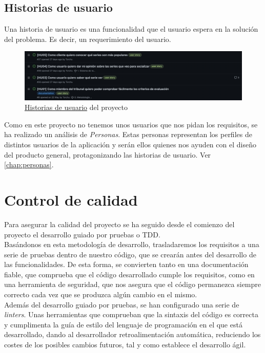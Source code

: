 \subsection{Historias de usuario}
Una historia de usuario es una funcionalidad que el usuario espera en la solución del problema. Es decir, un
requerimiento del usuario.\\

\begin{figure}[H]
	\centering	
	\includegraphics[scale=0.3]{img/user-stories.png}
	\caption{\href{https://github.com/Torchu/flixbuff/issues?q=label\%3A\%22user\%20story\%22}{Historias de usuario} del
	proyecto}\label{fig:user_stories}
\end{figure}

Como en este proyecto no tenemos unos usuarios que nos pidan los requisitos, se ha realizado un análisis de
\textit{Personas}\cite{personas}. Estas personas representan los perfiles de distintos usuarios de la aplicación y
serán ellos quienes nos ayuden con el diseño del producto general, protagonizando las historias de usuario. Ver
\autoref{chap:personas}.\\

\section{Control de calidad}\label{sec:control_de_calidad}
Para asegurar la calidad del proyecto se ha seguido desde el comienzo del proyecto el desarrollo guiado por pruebas o
TDD\cite{TDD}.\\

Basándonos en esta metodología de desarrollo, trasladaremos los requisitos a una serie de pruebas dentro de nuestro
código, que se crearán antes del desarrollo de las funcionalidades. De esta forma, se convierten tanto en una
documentación fiable, que comprueba que el código desarrollado cumple los requisitos, como en una herramienta de
seguridad, que nos asegura que el código permanezca siempre correcto cada vez que se produzca algún cambio en el
mismo.\\

Además del desarrollo guiado por pruebas, se han configurado una serie de \textit{linters}. Unas herramientas que
comprueban que la sintaxis del código es correcta y cumplimenta la guía de estilo del lenguaje de programación en el
que está desarrollado, dando al desarrollador retroalimentación automática, reduciendo los costes de los posibles
cambios futuros, tal y como establece el desarrollo ágil.\\

